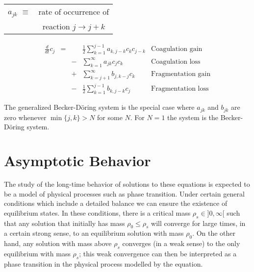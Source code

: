\documentclass{article}
\def\to{\rightarrow}
\begin{document}
\begin{multicols}{3}
\begin{center}
\begin{minipage}[t]{.4\linewidth}
\begin{center}
      \begin{tabular}{cc}
        $a_{jk}$   $\equiv$ &  rate of occurrence of\\
        &  reaction $j \to j+k$
      \end{tabular}
    \end{center}                    
  \end{minipage}

\end{center}


\vspace{.2cm}

\noindent
\colorbox{marronrp3}{
  \begin{minipage}[t]{.96\linewidth}
    \Large
    \begin{align*}
      \frac{d}{dt} c_j
      & = &&  \frac{1}{2} \sum_{k=1}^{j-1} a_{k,j-k}  c_k c_{j-k}
      &  \text{Coagulation gain}\\
      && - &\sum_{k=1}^{\infty} a_{jk} c_j c_k
      &   \text{Coagulation loss}\\
      && + &\sum_{k=j+1}^{\infty} b_{j,k-j} c_k
      &   \text{Fragmentation gain}\\
      && - &\frac{1}{2} \sum_{k=1}^{j-1} b_{k,j-k} c_j
      & \text{Fragmentation loss}
    \end{align*}
    \vspace{.02cm}
  \end{minipage}
}
\vspace{.4cm}

{\textcolor{rojo}{The generalized Becker-Döring system is the special
    case where $a_{jk}$ and $b_{jk}$ are zero whenever $\min\{j,k\} >
    N$ for some $N$. For $N=1$ the system is the Becker-Döring
    system.}  }

\section*{Asymptotic Behavior}

The study of the long-time behavior of solutions to these equations is
expected to be a model of physical processes such as phase transition.
Under certain general conditions which include a detailed balance we
can ensure the existence of equilibrium states. In these conditions,
there is a critical mass $\rho_s \in ]0,\infty[$ such that any
solution that initially has mass $\rho_0 \leq \rho_s$ will converge
for large times, in a certain strong sense, to an equilibrium solution
with mass $\rho_0$. On the other hand, any solution with mass above
$\rho_s$ converges (in a weak sense) to the only equilibrium with mass
$\rho_s$; this weak convergence can then be interpreted as a phase
transition in the physical process modelled by the equation.


\end{multicols}
\end{document}
